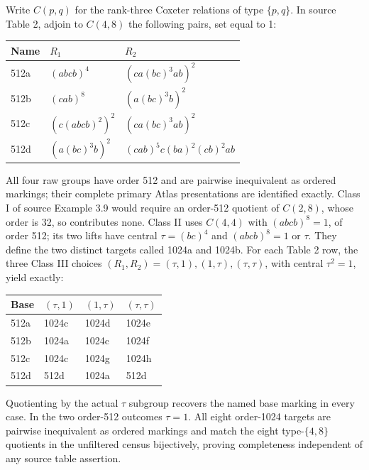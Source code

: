 Write \(C(p,q)\) for the rank-three Coxeter relations of type \(\{p,q\}\). In source Table 2, adjoin to \(C(4,8)\) the following pairs, set equal to 1:

{\def\LTcaptype{none} %
\begin{longtable}[]{@{}lll@{}}
\toprule\noalign{}
Name & \(R_{1}\) & \(R_{2}\) \\
\midrule\noalign{}
\endhead
\bottomrule\noalign{}
\endlastfoot
512a & \((abcb)^{4}\) & \((ca(bc)^{3}ab)^{2}\) \\
512b & \((cab)^{8}\) & \((a(bc)^{3}b)^{2}\) \\
512c & \((c(abcb)^{2})^{2}\) & \((ca(bc)^{3}ab)^{2}\) \\
512d & \((a(bc)^{3}b)^{2}\) & \((cab)^{5}c(ba)^{2}(cb)^{2}ab\) \\
\end{longtable}
}

All four raw groups have order 512 and are pairwise inequivalent as ordered markings; their complete primary Atlas presentations are identified exactly. Class I of source Example 3.9 would require an order-512 quotient of \(C(2,8)\), whose order is 32, so contributes none. Class II uses \(C(4,4)\) with \((abcb)^{8}=1\), of order 512; its two lifts have central \(\tau =(bc)^{4}\) and \((abcb)^{8}=1\) or \(\tau\). They define the two distinct targets called 1024a and 1024b. For each Table 2 row, the three Class III choices \((R_{1},R_{2})=(\tau ,1),(1,\tau ),(\tau ,\tau )\), with central \(\tau ^{2}=1\), yield exactly:

{\def\LTcaptype{none} %
\begin{longtable}[]{@{}llll@{}}
\toprule\noalign{}
Base & \((\tau ,1)\) & \((1,\tau )\) & \((\tau ,\tau )\) \\
\midrule\noalign{}
\endhead
\bottomrule\noalign{}
\endlastfoot
512a & 1024c & 1024d & 1024e \\
512b & 1024a & 1024c & 1024f \\
512c & 1024c & 1024g & 1024h \\
512d & 512d & 1024a & 512d \\
\end{longtable}
}

Quotienting by the actual \(\tau\) subgroup recovers the named base marking in every case. In the two order-512 outcomes \(\tau =1\). All eight order-1024 targets are pairwise inequivalent as ordered markings and match the eight type-\(\{4,8\}\) quotients in the unfiltered census bijectively, proving completeness independent of any source table assertion.

